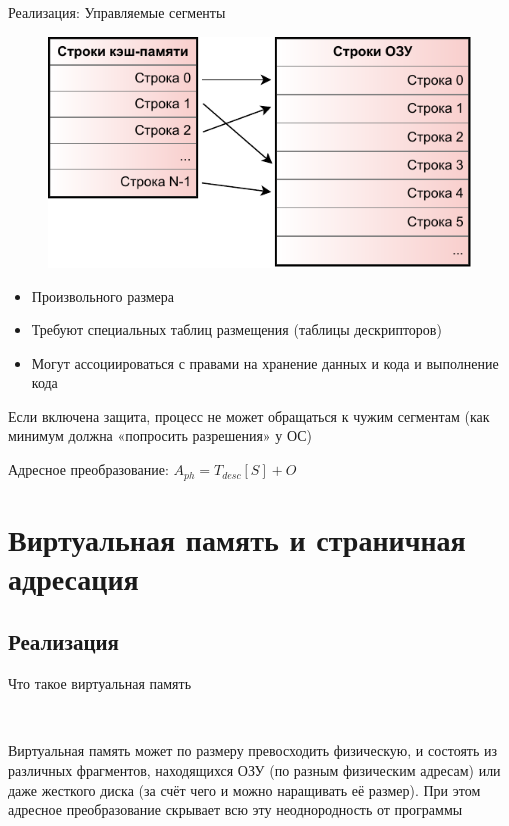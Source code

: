 \documentclass[xetex,aspectratio=43]{beamer}
\begin{document}
\begin{frame}{Реализация: Управляемые сегменты}

    \begin{figure}
        \includegraphics[page=3,height=0.55\textheight]{img/06.cache-and-vm-crop.pdf}
        \vspace{-5mm}
    \end{figure}

    \begin{itemize}
        \tightlist
        \item
        Произвольного размера
        \item
        Требуют специальных таблиц размещения (таблицы дескрипторов)
        \item
        Могут ассоциироваться с правами на хранение данных и кода и выполнение
        кода
    \end{itemize}

    \pause

    Если включена защита, процесс не может обращаться к чужим сегментам (как
    минимум должна «попросить разрешения» у ОС)

    Адресное преобразование: \(A_{ph} = T_{desc}[S] + O\)

\end{frame}

\section{Виртуальная память и страничная адресация}

\subsection{Реализация}

\begin{frame}{Что такое виртуальная память}

    ~

    Виртуальная память может по размеру превосходить физическую, и состоять
    из различных фрагментов, находящихся ОЗУ (по разным физическим адресам)
    или даже жесткого диска (за счёт чего и можно наращивать её размер). При
    этом адресное преобразование скрывает всю эту неоднородность от
    программы
\end{frame}
\end{document}
